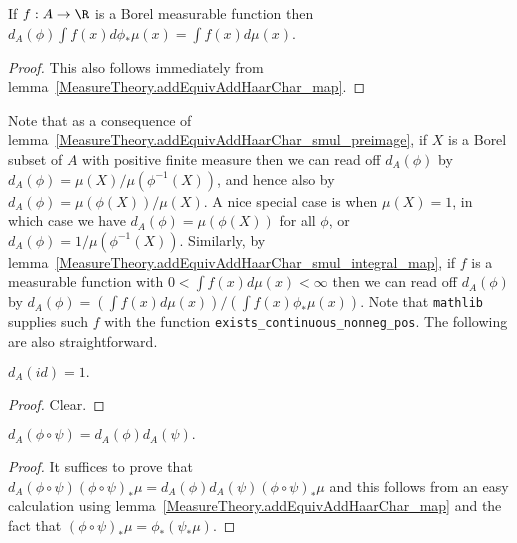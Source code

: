 \begin{lemma}
  \label{MeasureTheory.addEquivAddHaarChar_smul_integral_map}
  \leanok
  If $f:A\to\R$ is a Borel measurable function then
  $d_A(\phi)\int f(x)d\phi_*\mu(x)=\int f(x)d\mu(x)$.
\end{lemma}
\begin{proof}
  This also follows immediately from lemma~\ref{MeasureTheory.addEquivAddHaarChar_map}.
\end{proof}

Note that as a consequence of lemma~\ref{MeasureTheory.addEquivAddHaarChar_smul_preimage},
if $X$ is a Borel subset of $A$ with positive finite measure then we can read
off $d_A(\phi)$ by $d_A(\phi)=\mu(X)/\mu(\phi^{-1}(X))$, and hence also by
$d_A(\phi)=\mu(\phi(X))/\mu(X)$. A nice special case is when
$\mu(X)=1$, in which case we have $d_A(\phi)=\mu(\phi(X))$ for all $\phi$,
or $d_A(\phi)=1/\mu(\phi^{-1}(X))$.
Similarly, by lemma~\ref{MeasureTheory.addEquivAddHaarChar_smul_integral_map},
if $f$ is a measurable function with $0<\int f(x)d\mu(x)<\infty$ then
we can read off $d_A(\phi)$ by $d_A(\phi)=(\int f(x)d\mu(x))/(\int f(x)\phi_*\mu(x))$.
Note that {\tt mathlib} supplies such $f$ with the function {\tt exists\_continuous\_nonneg\_pos}.
The following are also straightforward.

\begin{lemma}
  \label{MeasureTheory.addEquivAddHaarChar_refl}
  \leanok
  $d_A(id)=1.$
\end{lemma}
\begin{proof}
  \leanok
  Clear.
\end{proof}

\begin{lemma}
  \label{MeasureTheory.addEquivAddHaarChar_trans}
  \leanok
  $d_A(\phi\circ\psi)=d_A(\phi)d_A(\psi).$
\end{lemma}
\begin{proof}
  \leanok
  It suffices to prove that $d_A(\phi\circ\psi)(\phi\circ\psi)_*\mu=d_A(\phi)d_A(\psi)(\phi\circ\psi)_*\mu$
  and this follows from an easy calculation using lemma~\ref{MeasureTheory.addEquivAddHaarChar_map}
  and the fact that $(\phi\circ\psi)_*\mu=\phi_*(\psi_*\mu)$.
\end{proof}

